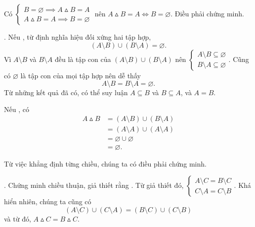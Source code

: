Có $\begin{cases}
   B = \varnothing \implies A \vartriangle B = A \\
   A \vartriangle B = A \implies B = \varnothing
\end{cases}$ nên $A \vartriangle B = A \iff B = \varnothing$. Điều phải chứng minh.

. Nếu , từ định nghĩa hiệu đối xứng hai tập hợp,
\begin{equation*}
   (A \setminus B) \cup (B \setminus A) = \varnothing.
\end{equation*}
Vì $A \setminus B$ và $B \setminus A$ đều là tập con của $(A \setminus B) \cup (B \setminus A)$ nên $\begin{cases}
   A \setminus B \subseteq \varnothing \\
   B \setminus A \subseteq \varnothing
\end{cases}$. Cũng có $\varnothing$ là tập con của mọi tập hợp nên dễ thấy
\begin{equation*}
   A \setminus B = B \setminus A = \varnothing.
\end{equation*}
Từ những kết quả đã có, có thể suy luận $A \subseteq B$ và $B \subseteq A$, và $A = B$.

Nếu , có
\begin{align*}
   A \vartriangle B &= (A \setminus B) \cup (B \setminus A) \\
      &= (A \setminus A) \cup (A \setminus A) \\
      &= \varnothing \cup \varnothing \\
      &= \varnothing.
\end{align*}

Từ việc khẳng định từng chiều, chúng ta có điều phải chứng minh. 

. Chứng minh chiều thuận, giả thiết rằng . Từ giả thiết đó, $\begin{cases}
   A \setminus C = B \setminus C \\
   C \setminus A = C \setminus B
\end{cases}$. Khá hiển nhiên, chúng ta cũng có 
\begin{equation*}
   (A \setminus C) \cup (C \setminus A) = (B \setminus C) \cup (C \setminus B)
\end{equation*}
và từ đó, $A \vartriangle C = B \vartriangle C$.

